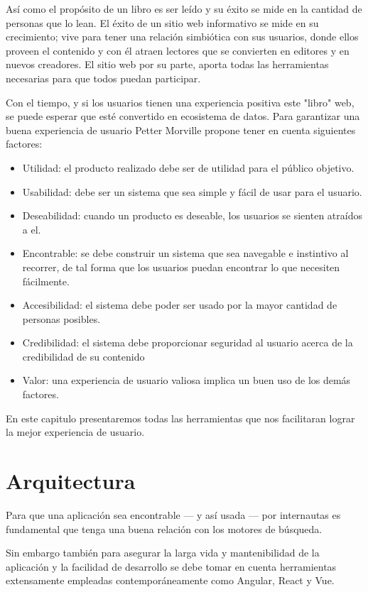 Así como el propósito de un libro es ser leído y su éxito se mide en la cantidad de personas que lo lean. 
El éxito de un sitio web informativo se mide en su crecimiento; vive para tener una relación simbiótica con sus usuarios, donde ellos proveen el contenido y con él atraen lectores que se convierten en editores y en nuevos creadores. El sitio web por su parte, aporta todas las herramientas necesarias para que todos puedan participar.

Con el tiempo, y si los usuarios tienen una experiencia positiva este "libro" web, se puede esperar que esté convertido en ecosistema de datos. Para garantizar una buena experiencia de usuario Petter Morville \cite{UXFactors} propone tener en cuenta siguientes factores:

\begin{itemize}
  \item Utilidad: el producto realizado debe ser de utilidad para el público objetivo.
  \item Usabilidad: debe ser un sistema que sea simple y fácil de usar para el usuario.
  \item Deseabilidad: cuando un producto es deseable, los usuarios se sienten atraídos a el.
  \item Encontrable: se debe construir un sistema que sea navegable e instintivo al recorrer, de tal forma que los usuarios puedan encontrar lo que necesiten fácilmente.
  \item Accesibilidad: el sistema debe poder ser usado por la mayor cantidad de personas posibles.
  \item Credibilidad: el sistema debe proporcionar seguridad al usuario acerca de la credibilidad de su contenido
  \item Valor: una experiencia de usuario valiosa implica un buen uso de los demás factores.
\end{itemize}

En este capitulo presentaremos todas las herramientas que nos facilitaran lograr la mejor experiencia de usuario.

\section{Arquitectura}

Para que una aplicación sea encontrable — y así usada — por internautas es fundamental que tenga una buena relación con los motores de búsqueda.

Sin embargo también para asegurar la larga vida y mantenibilidad de la aplicación y la facilidad de desarrollo se debe tomar en cuenta herramientas extensamente empleadas contemporáneamente como Angular, React y Vue.


